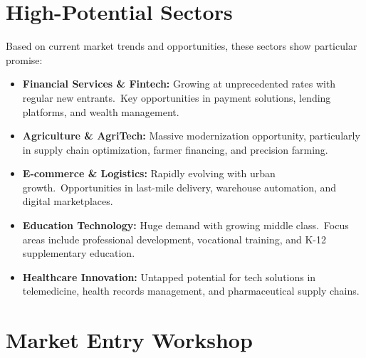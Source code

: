 \section{High-Potential Sectors}\label{sec:high-potential-sectors}

Based on current market trends and opportunities, these sectors show particular promise:

\begin{tcolorbox}[colback=white,colframe=primary,title=\textbf{Growth Sectors}]
\begin{itemize}
    \item \textbf{Financial Services \& Fintech:}
    Growing at unprecedented rates with regular new entrants.\ Key opportunities in payment solutions, lending platforms, and wealth management.

    \item \textbf{Agriculture \& AgriTech:}
    Massive modernization opportunity, particularly in supply chain optimization, farmer financing, and precision farming.

    \item \textbf{E-commerce \& Logistics:}
    Rapidly evolving with urban growth.\ Opportunities in last-mile delivery, warehouse automation, and digital marketplaces.

    \item \textbf{Education Technology:}
    Huge demand with growing middle class.\ Focus areas include professional development, vocational training, and K-12 supplementary education.

    \item \textbf{Healthcare Innovation:}
    Untapped potential for tech solutions in telemedicine, health records management, and pharmaceutical supply chains.
\end{itemize}
\end{tcolorbox}

\section{Market Entry Workshop}\label{sec:market-entry-workshop}

